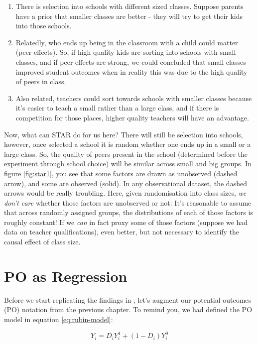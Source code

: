\documentclass[]{book}
\providecommand{\tightlist}{%
  \setlength{\itemsep}{0pt}\setlength{\parskip}{0pt}}
\begin{document}
\begin{enumerate}
\def\labelenumi{\arabic{enumi}.}
\tightlist
\item
  There is selection into schools with different sized classes. Suppose parents have a prior that smaller classes are better - they will try to get their kids into those schools.
\item
  Relatedly, who ends up being in the classroom with a child could matter (peer effects). So, if high quality kids are sorting into schools with small classes, and if peer effects are strong, we could concluded that small classes improved student outcomes when in reality this was due to the high quality of peers in class.
\item
  Also related, teachers could sort towards schools with smaller classes because it's easier to teach a small rather than a large class, and if there is competition for those places, higher quality teachers will have an advantage.
\end{enumerate}

Now, what can STAR do for us here? There will still be selection into schools, however, once selected a school it is random whether one ends up in a small or a large class. So, the quality of peers present in the school (determined before the experiment through school choice) will be similar across small and big groups. In figure \ref{fig:star1}, you see that some factors are drawn as unobserved (dashed arrow), and some are observed (solid). In any observational dataset, the dashed arrows would be really troubling. Here, given randomisation into class sizes, \emph{we don't care} whether those factors are unobserved or not: It's reasonable to assume that across randomly assigned groups, the distributions of each of those factors is roughly constant! If we \emph{can} in fact proxy some of those factors (suppose we had data on teacher qualifications), even better, but not necessary to identify the causal effect of class size.

\hypertarget{po-as-regression}{%
\section{PO as Regression}\label{po-as-regression}}

Before we start replicating the findings in \citet{krueger1999}, let's augment our potential outcomes (PO) notation from the previous chapter. To remind you, we had defined the PO model in equation \eqref{eq:rubin-model}:

\begin{equation*}
Y_i = D_i Y_i^1 + (1-D_i)Y_i^0 
\end{equation*}
\end{document}
